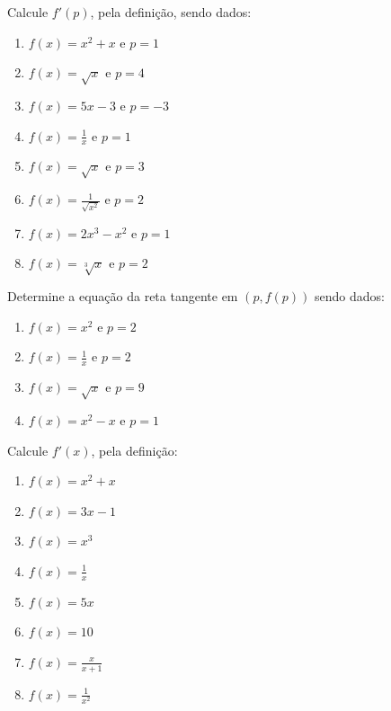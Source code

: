 \begin{exercicio}[4]
\label{ex:7.2.4}
Calcule $f'(p)$, pela definição, sendo dados:
\begin{enumerate}[label=\alph*)]
    \item $f(x) = x^2 + x$ e $p = 1$
    \item $f(x) = \sqrt{x}$ e $p = 4$
    \item $f(x) = 5x - 3$ e $p = -3$
    \item $f(x) = \frac{1}{x}$ e $p = 1$
    \item $f(x) = \sqrt{x}$ e $p = 3$
    \item $f(x) = \frac{1}{\sqrt{x^2}}$ e $p = 2$
    \item $f(x) = 2x^3 - x^2$ e $p = 1$
    \item $f(x) = \sqrt[3]{x}$ e $p = 2$
\end{enumerate}
\end{exercicio}

\begin{exercicio}[5]
\label{ex:7.2.5}
Determine a equação da reta tangente em $(p, f(p))$ sendo dados:
\begin{enumerate}[label=\alph*)]
    \item $f(x) = x^2$ e $p = 2$
    \item $f(x) = \frac{1}{x}$ e $p = 2$
    \item $f(x) = \sqrt{x}$ e $p = 9$
    \item $f(x) = x^2 - x$ e $p = 1$
\end{enumerate}
\end{exercicio}

\begin{exercicio}[6]
\label{ex:7.2.6}
Calcule $f'(x)$, pela definição:
\begin{enumerate}[label=\alph*)]
    \item $f(x) = x^2 + x$
    \item $f(x) = 3x - 1$
    \item $f(x) = x^3$
    \item $f(x) = \frac{1}{x}$
    \item $f(x) = 5x$
    \item $f(x) = 10$
    \item $f(x) = \frac{x}{x + 1}$
    \item $f(x) = \frac{1}{x^2}$
\end{enumerate}
\end{exercicio}

